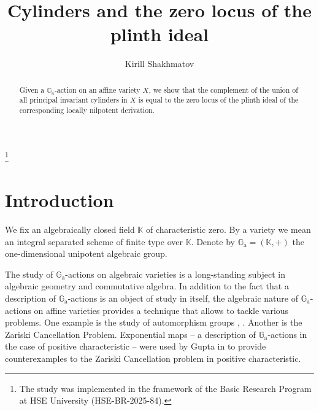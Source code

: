 \documentclass[a4paper, 12pt, reqno]{amsart}
\newcommand{\bb}{\mathbb}
\newcommand{\Ga}{\bb{G}_\mathrm{a}}
\theoremstyle{definition}
\theoremstyle{plain}
\begin{document}

\date{}
\title[Cylinders and the zero locus of the plinth ideal]{Cylinders and the zero locus of the plinth ideal}

\author[Kirill Shakhmatov]{Kirill Shakhmatov}
\address{HSE University, Faculty of Computer Science, Pokrovsky Boulevard 11, Moscow, 109028 Russia}

\thanks{The study was implemented in the framework of the Basic Research Program at HSE University (HSE-BR-2025-84).}



\begin{abstract}
Given a $\mathbb{G}_\mathrm{a}$-action on an affine variety $X$, we show that the complement of the union of all principal invariant cylinders in $X$ is equal to the zero locus of the plinth ideal of the corresponding locally nilpotent derivation.
\end{abstract}

\maketitle


\section{Introduction}


We fix an algebraically closed field $\bb{K}$ of characteristic zero. By a variety we mean an integral separated scheme of finite type over $\bb{K}$. Denote by $\Ga = (\bb{K}, +)$ the one-dimensional unipotent algebraic group.

The study of $\Ga$-actions on algebraic varieties is a long-standing subject in algebraic geometry and commutative algebra. In addition to the fact that a description of $\Ga$-actions is an object of study in itself, the algebraic nature of $\Ga$-actions on affine varieties provides a technique that allows to tackle various problems. One example is the study of automorphism groups \cite{M-L01}, \cite{Ga21}. Another is the Zariski Cancellation Problem. Exponential maps -- a description of $\Ga$-actions in the case of positive characteristic -- were used by Gupta in \cite{Gu14} to provide counterexamples to the Zariski Cancellation problem in positive characteristic.
\end{document}
